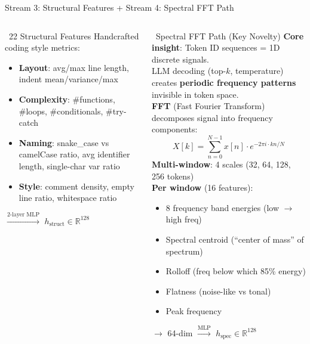 \documentclass[aspectratio=169, 10pt]{beamer}
\begin{document}
\begin{frame}{Stream 3: Structural Features + Stream 4: Spectral FFT Path}
\vspace{-0.15cm}
\begin{columns}[T]
\begin{block}{\faRuler\ 22 Structural Features}
\small
Handcrafted coding style metrics:
\begin{itemize}\setlength\itemsep{1pt}
    \item \textbf{Layout}: avg/max line length, indent mean/variance/max
    \item \textbf{Complexity}: \#functions, \#loops, \#conditionals, \#try-catch
    \item \textbf{Naming}: snake\_case vs camelCase ratio, avg identifier length, single-char var ratio
    \item \textbf{Style}: comment density, empty line ratio, whitespace ratio
\end{itemize}
\vspace{2pt}
$\xrightarrow{\text{2-layer MLP}}$ $h_{\text{struct}} \in \mathbb{R}^{128}$
\end{block}

\begin{alertblock}{\faWaveSquare\ Spectral FFT Path (Key Novelty)}
\small
\textbf{Core insight}: Token ID sequences = 1D discrete signals.\\
LLM decoding (top-$k$, temperature) creates \textbf{periodic frequency patterns} invisible in token space.\\[3pt]
\textbf{FFT} (Fast Fourier Transform) decomposes signal into frequency components:
$$X[k] = \sum_{n=0}^{N-1} x[n] \cdot e^{-2\pi i \cdot kn / N}$$
\textbf{Multi-window}: 4 scales (32, 64, 128, 256 tokens)\\
\textbf{Per window} (16 features):
\begin{itemize}\setlength\itemsep{0pt}
    \item 8 frequency band energies (low $\to$ high freq)
    \item Spectral centroid (``center of mass'' of spectrum)
    \item Rolloff (freq below which 85\% energy)
    \item Flatness (noise-like vs tonal)
    \item Peak frequency
\end{itemize}
$\to$ 64-dim $\xrightarrow{\text{MLP}}$ $h_{\text{spec}} \in \mathbb{R}^{128}$
\end{alertblock}
\end{columns}
\end{frame}
\end{document}

